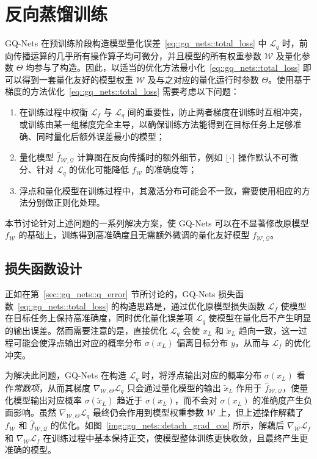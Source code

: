 \section{反向蒸馏训练} \label{sec::gq_nets::train}
GQ-Nets 在预训练阶段构造模型量化误差~\eqref{eq::gq_nets::total_loss} 中 $\mathcal{L}_q$ 时，前向传播运算的几乎所有操作算子均可微分，并且模型的所有权重参数 $\mathcal{W}$ 及量化参数 $\Theta$ 均参与了构造。因此，以适当的优化方法最小化~\eqref{eq::gq_nets::total_loss} 即可以得到一套量化友好的模型权重 $\mathcal{W}$ 及与之对应的量化运行时参数 $\Theta$。使用基于梯度的方法优化~\eqref{eq::gq_nets::total_loss} 需要考虑以下问题：
\begin{enumerate}[1)]
  \item 在训练过程中权衡 $\mathcal{L}_f$ 与 $\mathcal{L}_q$ 间的重要性，防止两者梯度在训练时互相冲突，或训练由某一组梯度完全主导，以确保训练方法能得到在目标任务上足够准确、同时量化后额外误差最小的模型；
  \item 量化模型 $\hat{f}_{\mathcal{W, Q}}$ 计算图在反向传播时的额外细节，例如 $\lfloor\cdot\rceil$ 操作默认不可微分、针对 $\mathcal{L}_q$ 的优化可能降低 $f_{\mathcal{W}}$ 的准确度等；
  \item 浮点和量化模型在训练过程中，其激活分布可能会不一致，需要使用相应的方法分别做正则化处理。
\end{enumerate}
本节讨论针对上述问题的一系列解决方案，使 GQ-Nets 可以在不显著修改原模型 $f_{\mathcal{W}}$ 的基础上，训练得到高准确度且无需额外微调的量化友好模型 $f_{\mathcal{W, Q}}$。
\subsection{损失函数设计}
正如在第~\ref{sec::gq_nets::q_error} 节所讨论的，GQ-Nets 损失函数~\eqref{eq::gq_nets::total_loss} 的构造思路是，通过优化原模型损失函数 $\mathcal{L}_f$ 使模型在目标任务上保持高准确度，同时优化量化误差项 $\mathcal{L}_q$ 使模型在量化后不产生明显的输出误差。然而需要注意的是，直接优化 $\mathcal{L}_q$ 会使 $x_L$ 和 $\tilde{x}_L$ 趋向一致，这一过程可能会使浮点输出对应的概率分布 $\sigma(x_L)$ 偏离目标分布 $y$，从而与 $\mathcal{L}_f$ 的优化冲突。

为解决此问题，GQ-Nets 在构造 $\mathcal{L}_q$ 时，将浮点输出对应的概率分布 $\sigma(x_L)$ 看作\emph{常数项}，从而其梯度 $\nabla_{\mathcal{W}, \Theta} \mathcal{L}_q$ 只会通过量化模型的输出 $\tilde{x}_L$ 作用于 $\hat{f}_{\mathcal{W, Q}}$，使量化模型输出对应概率 $\sigma(\tilde{x}_L)$ 趋近于 $\sigma(x_L)$，而不会对 $\sigma(x_L)$ 的准确度产生负面影响。虽然 $\nabla_{\mathcal{W}, \Theta} \mathcal{L}_q$ 最终仍会作用到模型权重参数 $\mathcal{W}$ 上，但上述操作解藕了 $f_{\mathcal{W}}$ 和 $\hat{f}_{\mathcal{W, Q}}$ 的优化。如图~\ref{img::gq_nets::detach_grad_cos} 所示，解藕后 $\nabla_{\mathcal{W}} \mathcal{L}_f$ 和 $\nabla_{\mathcal{W}} \mathcal{L}_f$ 在训练过程中基本保持正交，使模型整体训练更快收敛，且最终产生更准确的模型。

